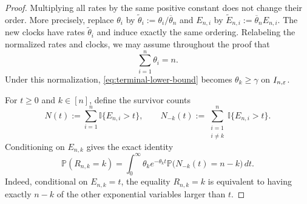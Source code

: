 \documentclass[10pt]{article}
\numberwithin{equation}{section}
\begin{document}
\begin{proof}
    Multiplying all rates by the same positive constant does not change their
    order.  More precisely, replace $\theta_i$ by
    $\widetilde\theta_i:=\theta_i/\overline\theta_n$ and $E_{n,i}$ by
    $\widetilde E_{n,i}:=\overline\theta_n E_{n,i}$.  The new clocks have
    rates $\widetilde\theta_i$ and induce exactly the same ordering.  Relabeling
    the normalized rates and clocks, we may assume throughout the proof that
    \begin{equation}\label{eq:late-normalization}
        \sum_{i=1}^n\theta_i=n.
    \end{equation}
    Under this normalization, \eqref{eq:terminal-lower-bound} becomes
    $\theta_k\geq\gamma$ on $I_{n,\varepsilon}$.

    For $t\geq0$ and $k\in[n]$, define the survivor counts
    \begin{equation}\label{eq:survivor-counts}
        N(t):=\sum_{i=1}^n\mathbb I\{E_{n,i}>t\},
        \qquad
        N_{-k}(t):=\sum_{\substack{i=1\\i\neq k}}^n
                    \mathbb I\{E_{n,i}>t\}.
    \end{equation}
    Conditioning on $E_{n,k}$ gives the exact identity
    \begin{equation}\label{eq:fixed-point-integral}
        \mathbb P(R_{n,k}=k)
        =\int_0^\infty \theta_k e^{-\theta_k t}
          \mathbb P\bigl(N_{-k}(t)=n-k\bigr)\,dt.
    \end{equation}
    Indeed, conditional on $E_{n,k}=t$, the equality $R_{n,k}=k$ is
    equivalent to having exactly $n-k$ of the other exponential variables
    larger than $t$.


\end{proof}
\end{document}
